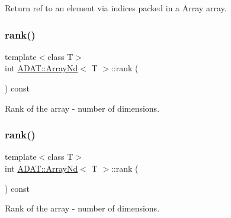 Return ref to an element via indices packed in a Array array. 

\mbox{\label{classADAT_1_1ArrayNd_a3f681a80aee7e76cc959431f45d931f8}} 
\subsubsection{\texorpdfstring{rank()}{rank()}\hspace{0.1cm}{\footnotesize\ttfamily [1/2]}}
{\footnotesize\ttfamily template$<$class T$>$ \\
int \mbox{\hyperlink{classADAT_1_1ArrayNd}{A\+D\+A\+T\+::\+Array\+Nd}}$<$ T $>$\+::rank (\begin{DoxyParamCaption}{ }\end{DoxyParamCaption}) const\hspace{0.3cm}{\ttfamily [inline]}}



Rank of the array -\/ number of dimensions. 

\mbox{\label{classADAT_1_1ArrayNd_a3f681a80aee7e76cc959431f45d931f8}} 
\subsubsection{\texorpdfstring{rank()}{rank()}\hspace{0.1cm}{\footnotesize\ttfamily [2/2]}}
{\footnotesize\ttfamily template$<$class T$>$ \\
int \mbox{\hyperlink{classADAT_1_1ArrayNd}{A\+D\+A\+T\+::\+Array\+Nd}}$<$ T $>$\+::rank (\begin{DoxyParamCaption}{ }\end{DoxyParamCaption}) const\hspace{0.3cm}{\ttfamily [inline]}}



Rank of the array -\/ number of dimensions. 

\mbox{\label{classADAT_1_1ArrayNd_afcf13cf80c4cb861316d1ad55601818e}} 
